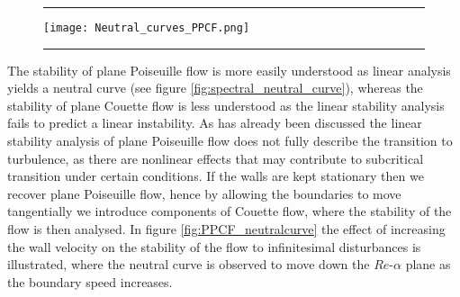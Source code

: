 \documentclass[a4paper, 12pt, twoside, openright]{article}
\numberwithin{equation}{section}
\begin{document}
\begin{figure}[ht]
\centering
\rule{\linewidth}{1.5pt}
\texttt{[image: Neutral\_curves\_PPCF.png]}
\rule{\linewidth}{1.5pt}
\end{figure}

The stability of plane Poiseuille flow is more easily understood as linear analysis yields a neutral curve (see figure \ref{fig:spectral_neutral_curve}), whereas the stability of plane Couette flow is less understood as the linear stability analysis fails to predict a linear instability. As has already been discussed the linear stability analysis of plane Poiseuille flow does not fully describe the transition to turbulence, as there are nonlinear effects that may contribute to subcritical transition under certain conditions. If the walls are kept stationary then we recover plane Poiseuille flow, hence by allowing the boundaries to move tangentially we introduce components of Couette flow, where the stability of the flow is then analysed. In figure \ref{fig:PPCF_neutralcurve} the effect of increasing the wall velocity on the stability of the flow to infinitesimal disturbances is illustrated, where the neutral curve is observed to move down the $Re$-$\alpha$ plane as the boundary speed increases.%
          
\end{document}
